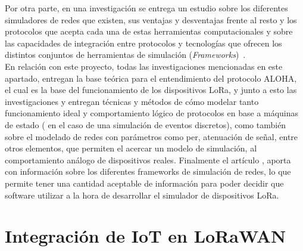 \begin{justify}
Por otra parte, en una investigación se entrega un estudio sobre los diferentes simuladores de redes que existen, sus ventajas y desventajas frente al resto y los protocolos que acepta cada una de estas herramientas computacionales y sobre las capacidades de integración entre protocolos y tecnologías que ofrecen los distintos conjuntos de herramientas de simulación (\textit{Frameworks})~\cite{Murat}.\\
En relación con este proyecto, todas las investigaciones mencionadas en este apartado, entregan la base teórica para el entendimiento del protocolo ALOHA, el cual es la base del funcionamiento de los dispositivos LoRa, y junto a esto las investigaciones \cite{Abdullah} y \cite{simulato} entregan técnicas y métodos de cómo modelar tanto funcionamiento ideal y comportamiento lógico de protocolos en base a máquinas de estado ( en el caso de una simulación de eventos discretos), como también sobre el modelado de redes con parámetros como \gls{per}, atenuación de señal, entre otros elementos, que permiten el acercar un modelo de simulación, al comportamiento análogo de dispositivos reales. Finalmente el artículo \cite{Murat}, aporta con información sobre los diferentes frameworks de simulación de redes, lo que permite tener una cantidad aceptable de información para poder decidir que software utilizar a la hora de desarrollar el simulador de dispositivos LoRa.

\section{Integración de IoT en LoRaWAN}


\end{justify}
